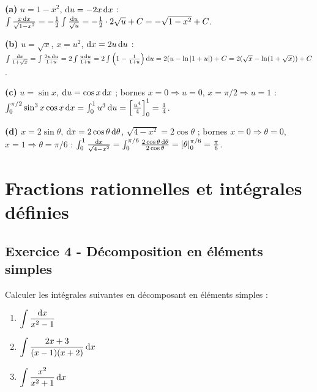 \documentclass[12pt,a4paper]{article}
\begin{document}
\begin{boitecorrige}
\textbf{(a)} $u=1-x^2$, $\mathrm{d} u=-2x\,\mathrm{d} x$ :
$\int\frac{x\,\mathrm{d} x}{\sqrt{1-x^2}} = -\frac{1}{2}\int\frac{\mathrm{d} u}{\sqrt{u}} = -\frac{1}{2}\cdot2\sqrt{u}+C = -\sqrt{1-x^2}+C$.

\textbf{(b)} $u=\sqrt{x}$, $x=u^2$, $\mathrm{d} x=2u\,\mathrm{d} u$ :
$\int\frac{\mathrm{d} x}{1+\sqrt{x}} = \int\frac{2u\,\mathrm{d} u}{1+u} = 2\int\frac{u\,\mathrm{d} u}{1+u} = 2\int\left(1-\frac{1}{1+u}\right)\mathrm{d} u = 2(u-\ln|1+u|)+C = 2(\sqrt{x}-\ln(1+\sqrt{x}))+C$.

\textbf{(c)} $u=\sin x$, $\mathrm{d} u=\cos x\,\mathrm{d} x$ ; bornes $x=0\Rightarrow u=0$, $x=\pi/2\Rightarrow u=1$ :
$\int_0^{\pi/2}\sin^3 x\cos x\,\mathrm{d} x = \int_0^1 u^3\,\mathrm{d} u = \left[\frac{u^4}{4}\right]_0^1 = \frac{1}{4}$.

\textbf{(d)} $x=2\sin\theta$, $\mathrm{d} x=2\cos\theta\,\mathrm{d}\theta$, $\sqrt{4-x^2}=2\cos\theta$ ; bornes $x=0\Rightarrow\theta=0$, $x=1\Rightarrow\theta=\pi/6$ :
$\int_0^1\frac{\mathrm{d} x}{\sqrt{4-x^2}} = \int_0^{\pi/6}\frac{2\cos\theta\,\mathrm{d}\theta}{2\cos\theta} = \left[\theta\right]_0^{\pi/6} = \frac{\pi}{6}$.
\end{boitecorrige}

\section{Fractions rationnelles et intégrales définies}

\subsection*{Exercice 4 - Décomposition en éléments simples \niveau{\moyen}}

\begin{boiteexercice}
Calculer les intégrales suivantes en décomposant en éléments simples :
\begin{enumerate}[label=(\alph*)]
  \item $\displaystyle\int\frac{\mathrm{d} x}{x^2-1}$
  \item $\displaystyle\int\frac{2x+3}{(x-1)(x+2)}\,\mathrm{d} x$
  \item $\displaystyle\int\frac{x^2}{x^2+1}\,\mathrm{d} x$
\end{enumerate}
\end{boiteexercice}
\end{document}
